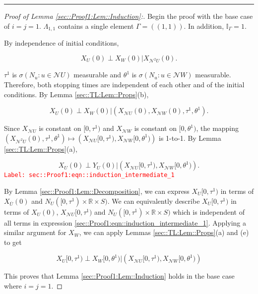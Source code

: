 \documentclass[12pt]{article}
\newcommand{\mb}{\mathbb}
\newcommand{\mc}{\mathcal}
\newcommand{\ov}{\overline}
\newcommand{\tr}{\textcolor{red}}
\newcommand{\labe}[1]{\tr{\texttt{Label: #1}}}
\newcommand{\lin}{\rule{\linewidth}{0.4 pt}}
\newcommand{\neigh}{\mc{N}}					%
\newcommand{\dneigh}{\mc{N}^2}				%
\newcommand{\vv}{u}								%
\renewcommand{\U}{U}							%
\newcommand{\UU}{W}								%
\renewcommand{\S}{S}							%
\newcommand{\cl}{\ov}							%
\newcommand{\poiss}[1]{N_{#1}}						%
\newcommand{\rt}[1]{\tau^{#1}}						%
\newcommand{\rtt}[1]{\theta^{#1}}					%
\newcommand{\itt}{i}								%
\newcommand{\ittt}{j}								%
\newcommand{\rxvt}[2]{X_{#1}{(#2)}}					%
\newcommand{\rxvtt}[2]{Y_{#1}{(#2)}}				%
\newcommand{\rxvts}[2]{X_{#1}{#2}}					%
\newcommand{\apath}{\Gamma}						%
\newcommand{\pathset}[2]{\Lambda_{#1,#2}}			%
\begin{document}
\lin

\begin{proof}[Proof of Lemma \ref{sec::Proof1:Lem::Induction}:]
Begin the proof with the base case of \(\itt=\ittt =1\). \(\pathset{1}{1}\) contains a single element \(\apath = ((1,1))\). In addition, \(\mb{I}_{\apath} = 1\).

By independence of initial conditions,

\[\rxvt{\U}{0}\perp \rxvt{\UU}{0}|\rxvt{\dneigh{\U}}{0}.\]

\(\rt{1}\) is \(\sigma\left(\poiss{\vv}:\vv\in \neigh{\U}\right)\) measurable and \(\rtt{1}\) is \(\sigma\left(\poiss{\vv}:\vv\in \neigh{\UU}\right)\) measurable. Therefore, both stopping times are independent of each other and of the initial conditions. By Lemma \ref{sec::TL:Lem::Props}(b), 

\[\rxvt{\U}{0}\perp \rxvt{\UU}{0}|\left(\rxvt{\neigh{\U}}{0},\rxvt{\neigh{\UU}}{0},\rt{1},\rtt{1}\right).\]

Since \(\rxvts{\neigh{\U}}{}\) is constant on \([0,\rt{1})\) and \(\rxvts{\neigh{\UU}}{}\) is constant on \([0,\rtt{1})\), the mapping \((\rxvt{\dneigh{\U}}{0},\rt{1},\rtt{1}) \mapsto (\rxvts{\neigh{\U}}{[0,\rt{1})},\rxvts{\neigh{\UU}}{[0,\rtt{1})})\) is 1-to-1. By Lemma \ref{sec::TL:Lem::Props}(a),

\begin{equation}
\rxvt{\U}{0}\perp \rxvtt{\U}{0}|\left(\rxvts{\neigh{\U}}{[0,\rt{1})},\rxvts{\neigh{\UU}}{[0,\rtt{1})}\right).
\label{sec::Proof1:eqn::induction_intermediate_1}
\end{equation}
\labe{sec::Proof1:eqn::induction\_intermediate\_1}

By Lemma \ref{sec::Proof1:Lem::Decomposition}, we can express \(\rxvts{\U}{[0,\rt{1})}\) in terms of \(\rxvt{\cl{\U}}{0}\) and \(\poiss{\U}([0,\rt{1})\times\mb{R}\times\S)\). We can equivalently describe \(\rxvts{\U}{[0,\rt{1})}\) in terms of \(\rxvt{\U}{0}\), \(\rxvts{\neigh{\U}}{[0,\rt{1})}\) and \(\poiss{\U}([0,\rt{1})\times \mb{R}\times \S)\) which is independent of all terms in expression \eqref{sec::Proof1:eqn::induction_intermediate_1}. Applying a similar argument for \(\rxvts{\UU}{}\), we can apply Lemmas \ref{sec::TL:Lem::Props}(a) and (e) to get

\[\rxvts{\U}{[0,\rt{1})}\perp \rxvts{\UU}{[0,\rtt{1})}|\left(\rxvts{\neigh{\U}}{[0,\rt{1})},\rxvts{\neigh{\UU}}{[0,\rtt{1})}\right)\]

This proves that Lemma \ref{sec::Proof1:Lem::Induction} holds in the base case where \(\itt = \ittt = 1\).


\end{proof}
\end{document}
